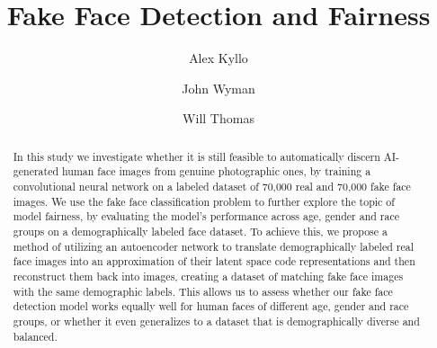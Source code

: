 \documentclass[11pt, letterpaper]{article}
\title{Fake Face Detection and Fairness}
\author{
  Alex Kyllo
  \and
  John Wyman
  \and
  Will Thomas
}
\begin{document}
\maketitle

\begin{abstract}
  In this study we investigate whether it is still feasible to automatically
  discern AI-generated human face images from genuine photographic ones, by
  training a convolutional neural network on a labeled dataset of 70,000 real
  and 70,000 fake face images. We use the fake face classification problem to
  further explore the topic of model fairness, by evaluating the model's
  performance across age, gender and race groups on a demographically labeled
  face dataset. To achieve this, we propose a method of utilizing an autoencoder
  network to translate demographically labeled real face images into an
  approximation of their latent space code representations and then reconstruct
  them back into images, creating a dataset of matching fake face images with
  the same demographic labels. This allows us to assess whether our fake face
  detection model works equally well for human faces of different age, gender
  and race groups, or whether it even generalizes to a dataset that is
  demographically diverse and balanced.
\end{abstract}
\end{document}
